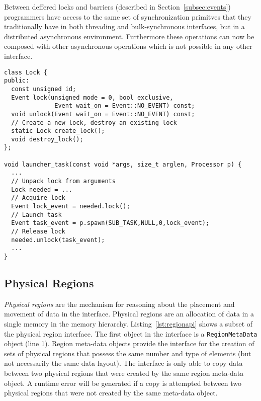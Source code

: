 Between deffered locks and barriers (described in Section~\ref{subsec:events}) programmers
have access to the same set of synchronization primitves that they traditionally have
in both threading and bulk-synchronous interfaces, but in a distributed asynchronous
environment.  Furthermore these operations can now be composed with other asynchronous
operations which is not possible in any other interface.



\begin{lstlisting}[float={t},label={lst:lockapi},caption={Deferred Lock Interface and Example.}]
class Lock {
public:
  const unsigned id;
  Event lock(unsigned mode = 0, bool exclusive, 
              Event wait_on = Event::NO_EVENT) const;
  void unlock(Event wait_on = Event::NO_EVENT) const;
  // Create a new lock, destroy an existing lock
  static Lock create_lock();
  void destroy_lock();
};

void launcher_task(const void *args, size_t arglen, Processor p) {
  ...
  // Unpack lock from arguments
  Lock needed = ...
  // Acquire lock
  Event lock_event = needed.lock();
  // Launch task
  Event task_event = p.spawn(SUB_TASK,NULL,0,lock_event);
  // Release lock
  needed.unlock(task_event);
  ...
}
\end{lstlisting}

\subsection{Physical Regions}
\label{subsec:phyreg}

{\em Physical regions} are the mechanism for reasoning about
the placement and movement of data in the interface.  Physical regions are an 
allocation of data in a single memory in the memory hierarchy.  Listing~\ref{lst:regionapi} 
shows a subset of the physical region interface.  The first object in the interface
is a {\tt RegionMetaData} object (line 1).  Region meta-data objects provide the interface for the
creation of sets of physical regions that possess the same number and type of elements (but not necessarily
the same data layout).  The interface is only able
to copy data between two physical regions that were created by the
same region meta-data object.  A runtime error will be generated if a copy is attempted
between two physical regions that were not created by the same meta-data object.

